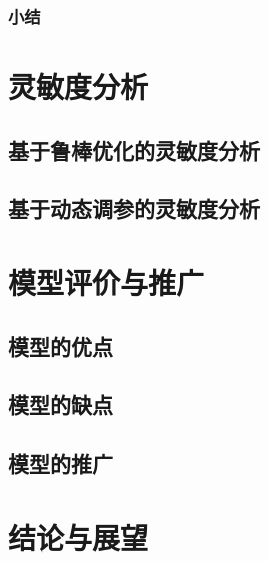 \documentclass[withoutpreface]{cumcmthesis}
\begin{document}
\subsubsection{小结}

\section{灵敏度分析}
\subsection{基于鲁棒优化的灵敏度分析}
\subsection{基于动态调参的灵敏度分析}

\section{模型评价与推广}
\subsection{模型的优点}
\subsection{模型的缺点}
\subsection{模型的推广}

\section{结论与展望}



\end{document}
